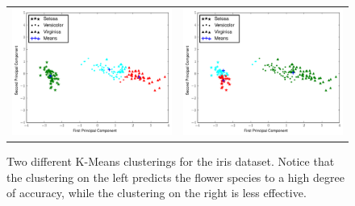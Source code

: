 \begin{figure}[h]
	\centering
	\begin{tabular}{cc}
	\includegraphics[width=.49\textwidth]{iris_means_1.pdf} &
	\includegraphics[width=.49\textwidth]{iris_means_2.pdf}
	\end{tabular}
	\caption{Two different K-Means clusterings for the iris dataset.
            Notice that the clustering on the left predicts the flower species to a high degree of accuracy,
            while the clustering on the right is less effective.}
    \label{fig:iris_clusterings}
\end{figure}

